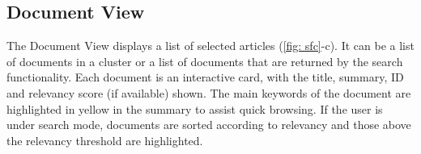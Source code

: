 \subsection{Document View}
The Document View displays a list of selected articles (\autoref{fig: sfc}-c).
It can be a list of documents in a cluster or a list of documents that are returned by the search functionality.
Each document is an interactive card, with the title, summary, ID and relevancy score (if available) shown.
The main keywords of the document are highlighted in yellow in the summary to assist quick browsing.
If the user is under search mode, documents are sorted according to relevancy and those above the relevancy threshold are highlighted.


